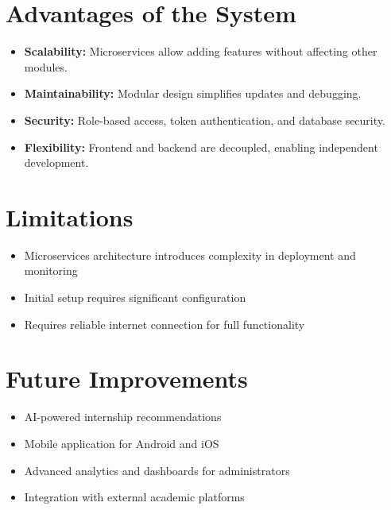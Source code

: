 \documentclass[11pt,a4paper]{article}
\begin{document}
\section{Advantages of the System}

\begin{itemize}
    \item \textbf{Scalability:} Microservices allow adding features without affecting other modules.
    \item \textbf{Maintainability:} Modular design simplifies updates and debugging.
    \item \textbf{Security:} Role-based access, token authentication, and database security.
    \item \textbf{Flexibility:} Frontend and backend are decoupled, enabling independent development.
\end{itemize}



\section{Limitations}

\begin{itemize}
    \item Microservices architecture introduces complexity in deployment and monitoring
    \item Initial setup requires significant configuration
    \item Requires reliable internet connection for full functionality
\end{itemize}



\section{Future Improvements}

\begin{itemize}
    \item AI-powered internship recommendations
    \item Mobile application for Android and iOS
    \item Advanced analytics and dashboards for administrators
    \item Integration with external academic platforms
\end{itemize}
\end{document}
